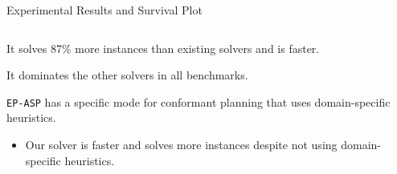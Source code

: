 \documentclass[aspectratio=169,svgnames,xcolor=table,t]{beamer}
\begin{document}
\begin{frame}{Experimental Results and Survival Plot}
    \begin{columns}[T]
        \begin{column}{0.45\textwidth}
            \begin{myitemize}
                \small
                \item It solves 87\% more instances than existing solvers and is  faster.

                \bigskip

                \item It dominates the other solvers in all benchmarks.
                
                \bigskip
                
                \item \texttt{EP-ASP} has a specific mode for conformant planning that uses domain-specific heuristics.
                \begin{itemize}
                    \item Our solver is  faster and solves  more instances despite not using domain-specific heuristics.
                \end{itemize}
            \end{myitemize}
        \end{column}
        \begin{column}{0.5\textwidth}
            \hspace*{-13pt}
            
        \end{column}
    \end{columns}

\end{frame}
            
\end{document}
